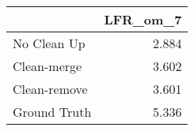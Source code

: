 \begin{tabular}{lr}
\toprule
{} & LFR_om_7 \\
\midrule
No Clean Up  &    2.884 \\
Clean-merge  &    3.602 \\
Clean-remove &    3.601 \\
Ground Truth &    5.336 \\
\bottomrule
\end{tabular}
